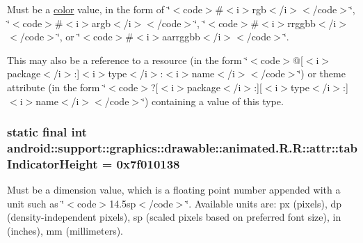 Must be a \hyperlink{classandroid_1_1support_1_1graphics_1_1drawable_1_1animated_1_1_r_1_1color}{color} value, in the form of \char`\"{}$<$code$>$\#$<$i$>$rgb$<$/i$>$$<$/code$>$\char`\"{}, \char`\"{}$<$code$>$\#$<$i$>$argb$<$/i$>$$<$/code$>$\char`\"{}, \char`\"{}$<$code$>$\#$<$i$>$rrggbb$<$/i$>$$<$/code$>$\char`\"{}, or \char`\"{}$<$code$>$\#$<$i$>$aarrggbb$<$/i$>$$<$/code$>$\char`\"{}. 

This may also be a reference to a resource (in the form \char`\"{}$<$code$>$@\mbox{[}$<$i$>$package$<$/i$>$:\mbox{]}$<$i$>$type$<$/i$>$:$<$i$>$name$<$/i$>$$<$/code$>$\char`\"{}) or theme attribute (in the form \char`\"{}$<$code$>$?\mbox{[}$<$i$>$package$<$/i$>$:\mbox{]}\mbox{[}$<$i$>$type$<$/i$>$:\mbox{]}$<$i$>$name$<$/i$>$$<$/code$>$\char`\"{}) containing a value of this type. \hypertarget{classandroid_1_1support_1_1graphics_1_1drawable_1_1animated_1_1_r_1_1attr_c65360b7e2b40c73a880a2b6ff895119}{
\subsubsection[{tabIndicatorHeight}]{\setlength{\rightskip}{0pt plus 5cm}static final int android::support::graphics::drawable::animated.R.R::attr::tabIndicatorHeight = 0x7f010138}}
\label{classandroid_1_1support_1_1graphics_1_1drawable_1_1animated_1_1_r_1_1attr_c65360b7e2b40c73a880a2b6ff895119}


Must be a dimension value, which is a floating point number appended with a unit such as \char`\"{}$<$code$>$14.5sp$<$/code$>$\char`\"{}. Available units are: px (pixels), dp (density-independent pixels), sp (scaled pixels based on preferred font size), in (inches), mm (millimeters). 

